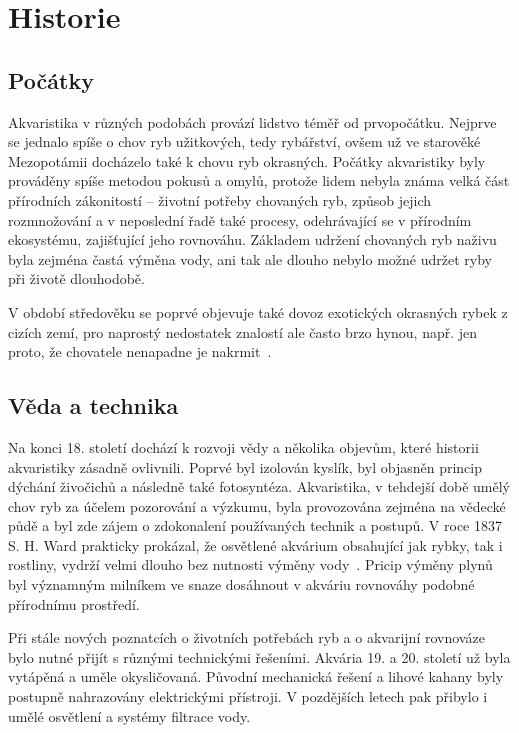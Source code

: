 \section{Historie}
\subsection{Počátky}
Akvaristika v různých podobách provází lidstvo téměř od prvopočátku. Nejprve se jednalo spíše o chov ryb užitkových, tedy rybářství, ovšem už ve starověké Mezopotámii docházelo také k chovu ryb okrasných. Počátky akvaristiky byly prováděny spíše metodou pokusů a omylů, protože lidem nebyla známa velká část přírodních zákonitostí -- životní potřeby chovaných ryb, způsob jejich rozmnožování a v neposlední řadě také procesy, odehrávající se v přírodním ekosystému, zajišťující jeho rovnováhu. Základem udržení chovaných ryb naživu byla zejména častá výměna vody, ani tak ale dlouho nebylo možné udržet ryby při životě dlouhodobě. 

V období středověku se poprvé objevuje také dovoz exotických okrasných rybek z cizích zemí, pro naprostý nedostatek znalostí ale často brzo hynou, např. jen proto, že chovatele nenapadne je nakrmit~\cite{vitek_akvaristika}.

\subsection{Věda a technika}
Na konci 18. století dochází k rozvoji vědy a několika objevům, které historii akvaristiky zásadně ovlivnili. Poprvé byl izolován kyslík, byl objasněn princip dýchání živočichů a následně také fotosyntéza. Akvaristika, v tehdejší době umělý chov ryb za účelem pozorování a výzkumu, byla provozována zejména na vědecké půdě a byl zde zájem o zdokonalení používaných technik a postupů. V roce 1837 S. H. Ward prakticky prokázal, že osvětlené akvárium obsahující jak rybky, tak i rostliny, vydrží velmi dlouho bez nutnosti výměny vody~\cite{vitek_akvaristika}. Pricip výměny plynů byl významným milníkem ve snaze dosáhnout v akváriu rovnováhy podobné přírodnímu prostředí. 

Při stále nových poznatcích o životních potřebách ryb a o akvarijní rovnováze bylo nutné přijít s různými technickými řešeními. Akvária 19. a 20. století už byla vytápěná a uměle okysličovaná. Původní mechanická řešení a lihové kahany byly postupně nahrazovány elektrickými přístroji. V pozdějších letech pak přibylo i umělé osvětlení a systémy filtrace vody. 